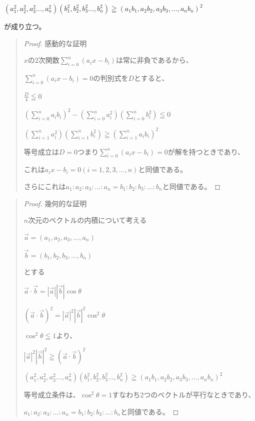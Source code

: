 \documentclass[uplatex,fleqn]{jsbook}
\begin{document}
$\left(a^2_1,a^2_2,a^2_3\dots,a^2_n\right)\left(b^2_1,b^2_2,b^2_3\dots,b^2_n\right)\geqq\left(a_1b_1,a_2b_2,a_3b_3,\dots,a_nb_n\right)^2$

が成り立つ。
\begin{quote}
    \begin{proof}
        感動的な証明

        $x$の2次関数$\displaystyle \sum_{i=0}^{n}(a_ix-b_i)$は常に非負であるから、

        $\displaystyle \sum_{i=0}^{n}(a_ix-b_i)=0$の判別式を$D$とすると、

        $\displaystyle\frac{D}{4}\leqq 0$

        $\displaystyle \left(\sum_{i=0}^{n}a_ib_i\right)^2-\left(\sum_{i=0}^{n}a_i^2\right)\left(\sum_{i=0}^{n}b_i^2\right)\leqq 0$

        $\displaystyle \left(\sum_{i=1}^n a^2_i\right)\left(\sum_{i=1}^n b^2_i\right)\geqq\left(\sum_{i=1}^n a_ib_i\right)^2$

        等号成立は$D=0$つまり$\displaystyle \sum_{i=0}^{n}(a_ix-b_i)=0$が解を持つときであり、

        これは$a_ix-b_i=0 \left(i = 1,2,3,\dots ,n\right)$と同値である。

        さらにこれは$a_1:a_2:a_3:\dots:a_n=b_1:b_2:b_3:\dots:b_n$と同値である。
    \end{proof}
\end{quote}

\begin{quote}
    \begin{proof}
        幾何的な証明

        $n$次元のベクトルの内積について考える

        $\vec{a}=\left(a_1,a_2,a_3,\dots,a_n\right)$

        $\vec{b}=\left(b_1,b_2,b_3,\dots,b_n\right)$

        とする

        $\vec{a}\cdot\vec{b}=|\vec{a}||\vec{b}|\cos\theta$

        $\left(\vec{a}\cdot\vec{b}\right)^2=|\vec{a}|^2|\vec{b}|^2\cos^2\theta$

        $\cos^2\theta\leqq1$より、

        $|\vec{a}|^2|\vec{b}|^2\geqq\left(\vec{a}\cdot\vec{b}\right)^2$

        $\left(a^2_1,a^2_2,a^2_3\dots,a^2_n\right)\left(b^2_1,b^2_2,b^2_3\dots,b^2_n\right)\geqq\left(a_1b_1,a_2b_2,a_3b_3,\dots,a_nb_n\right)^2$

        等号成立条件は、$\cos^2\theta=1$すなわち2つのベクトルが平行なときであり、

        $a_1:a_2:a_3:\dots:a_n=b_1:b_2:b_3:\dots:b_n$と同値である。
    \end{proof}
\end{quote}
\end{document}
